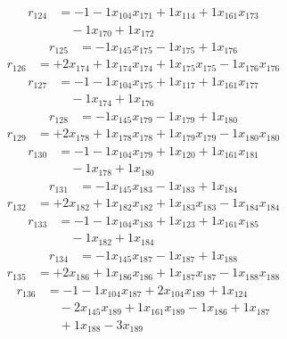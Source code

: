 \[\begin{aligned}
r_{124} &= - 1 - 1 x_{104} x_{171} + 1 x_{114} + 1 x_{161} x_{173} \\
 &\quad - 1 x_{170} + 1 x_{172}
\end{aligned}\]
\[\begin{aligned}
r_{125} &= - 1 x_{145} x_{175} - 1 x_{175} + 1 x_{176}
\end{aligned}\]
\[\begin{aligned}
r_{126} &= + 2 x_{174} + 1 x_{174} x_{174} + 1 x_{175} x_{175} - 1 x_{176} x_{176}
\end{aligned}\]
\[\begin{aligned}
r_{127} &= - 1 - 1 x_{104} x_{175} + 1 x_{117} + 1 x_{161} x_{177} \\
 &\quad - 1 x_{174} + 1 x_{176}
\end{aligned}\]
\[\begin{aligned}
r_{128} &= - 1 x_{145} x_{179} - 1 x_{179} + 1 x_{180}
\end{aligned}\]
\[\begin{aligned}
r_{129} &= + 2 x_{178} + 1 x_{178} x_{178} + 1 x_{179} x_{179} - 1 x_{180} x_{180}
\end{aligned}\]
\[\begin{aligned}
r_{130} &= - 1 - 1 x_{104} x_{179} + 1 x_{120} + 1 x_{161} x_{181} \\
 &\quad - 1 x_{178} + 1 x_{180}
\end{aligned}\]
\[\begin{aligned}
r_{131} &= - 1 x_{145} x_{183} - 1 x_{183} + 1 x_{184}
\end{aligned}\]
\[\begin{aligned}
r_{132} &= + 2 x_{182} + 1 x_{182} x_{182} + 1 x_{183} x_{183} - 1 x_{184} x_{184}
\end{aligned}\]
\[\begin{aligned}
r_{133} &= - 1 - 1 x_{104} x_{183} + 1 x_{123} + 1 x_{161} x_{185} \\
 &\quad - 1 x_{182} + 1 x_{184}
\end{aligned}\]
\[\begin{aligned}
r_{134} &= - 1 x_{145} x_{187} - 1 x_{187} + 1 x_{188}
\end{aligned}\]
\[\begin{aligned}
r_{135} &= + 2 x_{186} + 1 x_{186} x_{186} + 1 x_{187} x_{187} - 1 x_{188} x_{188}
\end{aligned}\]
\[\begin{aligned}
r_{136} &= - 1 - 1 x_{104} x_{187} + 2 x_{104} x_{189} + 1 x_{124} \\
 &\quad - 2 x_{145} x_{189} + 1 x_{161} x_{189} - 1 x_{186} + 1 x_{187} \\
 &\quad + 1 x_{188} - 3 x_{189}
\end{aligned}\]
